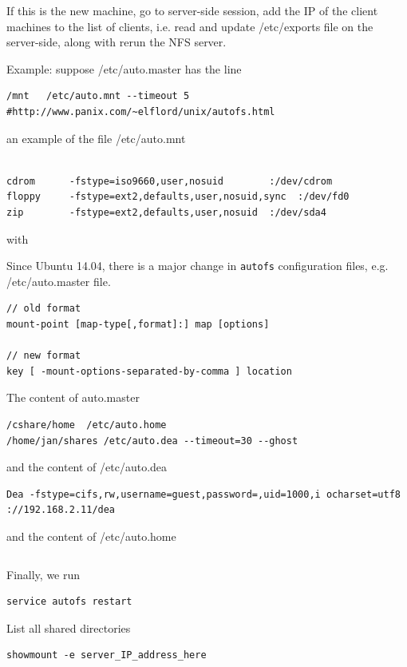 If this is the new machine, go to server-side session, add the IP of the client
machines to the list of clients, i.e. read and update /etc/exports file on the
server-side, along with rerun the NFS server.

Example: suppose /etc/auto.master has the line
\begin{verbatim}
/mnt   /etc/auto.mnt --timeout 5
#http://www.panix.com/~elflord/unix/autofs.html
\end{verbatim}
an example of the file /etc/auto.mnt
\begin{verbatim}

cdrom      -fstype=iso9660,user,nosuid        :/dev/cdrom
floppy     -fstype=ext2,defaults,user,nosuid,sync  :/dev/fd0
zip        -fstype=ext2,defaults,user,nosuid  :/dev/sda4
\end{verbatim}
with 


\begin{mdframed}
Since Ubuntu 14.04, there is a major change in \verb!autofs! configuration
files, e.g. /etc/auto.master file.
\begin{verbatim}
// old format
mount-point [map-type[,format]:] map [options]

// new format
key [ -mount-options-separated-by-comma ] location
\end{verbatim}

The content of auto.master
\begin{verbatim}
/cshare/home  /etc/auto.home
/home/jan/shares /etc/auto.dea --timeout=30 --ghost
\end{verbatim}
and the content of /etc/auto.dea
\begin{verbatim}
Dea -fstype=cifs,rw,username=guest,password=,uid=1000,i ocharset=utf8  ://192.168.2.11/dea
\end{verbatim}

and the content of /etc/auto.home
\begin{verbatim}

\end{verbatim}
\end{mdframed}

Finally, we run
\begin{verbatim}
service autofs restart
\end{verbatim}


List all shared directories
\begin{verbatim}
showmount -e server_IP_address_here
\end{verbatim}


